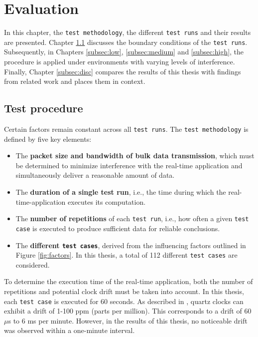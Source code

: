 \chapter{Evaluation} \label{sec:eval}
In this chapter, the \texttt{test methodology}, the different \texttt{\texttt{test runs}} and their results are presented.  
Chapter \ref{subsec:procedure} discusses the boundary conditions of the \texttt{\texttt{test runs}}.  
Subsequently, in Chapters \ref{subsec:low}, \ref{subsec:medium} and \ref{subsec:high}, the procedure is applied under environments with varying levels of interference.  
Finally, Chapter \ref{subsec:disc} compares the results of this thesis with findings from related work and places them in context.  

\section{Test procedure} \label{subsec:procedure}

Certain factors remain constant across all \texttt{test runs}.  
The \texttt{test methodology} is defined by five key elements:  
\begin{itemize}
    \item The \textbf{packet size and bandwidth of bulk data transmission}, which must be determined to minimize interference with the real-time application and simultaneously deliver a reasonable amount of data.  
    \item The \textbf{duration of a single test run}, i.e., the time during which the real-time-application executes its computation.  
    \item The \textbf{number of repetitions} of each \texttt{test run}, i.e., how often a given \texttt{test case} is executed to produce sufficient data for reliable conclusions.  
    \item The \textbf{different \texttt{test cases}}, derived from the influencing factors outlined in Figure \ref{fig:factors}.  
    In this thesis, a total of 112 different \texttt{test cases} are considered.  
\end{itemize}  

To determine the execution time of the real-time application, both the number of repetitions and potential clock drift must be taken into account.  
In this thesis, each \texttt{test case} is executed for 60 seconds.  
As described in \cite[p. 3]{drift}, quartz clocks can exhibit a drift of 1-100 ppm (parts per million).  
This corresponds to a drift of 60 $\mu$s to 6 ms per minute.  
However, in the results of this thesis, no noticeable drift was observed within a one-minute interval.  

